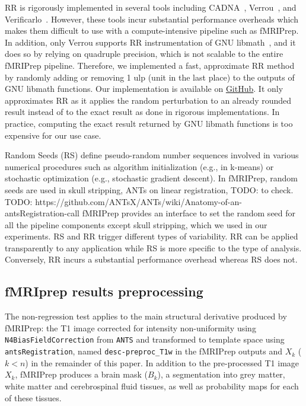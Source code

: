 \documentclass{article}
\newcommand{\TODO}[1]{\color{red}\textsc{TODO:} #1\color{black}\xspace}
\newcommand{\fmriprep}{fMRIPrep\xspace}
\begin{document}
RR is rigorously implemented in several tools including CADNA~\cite{jezequel2008cadna}, Verrou~\cite{fevotte2016verrou}, and Verificarlo~\cite{denis2016verificarlo}. However, these tools incur substantial performance overheads which makes them difficult to use with a compute-intensive pipeline such as fMRIPrep. In addition, only Verrou supports RR instrumentation of GNU libmath~\cite{fevotte2019debugging}, and it does so by relying on quadruple precision, which is not scalable to the entire fMRIPrep pipeline. Therefore, we implemented a fast, approximate RR method by randomly adding or removing 1 ulp (unit in the last place) to the outputs of GNU libmath functions. Our implementation is available on \href{https://github.com/verificarlo/fuzzy}{GitHub}. It only approximates RR as it applies the random perturbation to an already rounded result instead of to the exact result as done in rigorous implementations. In practice, computing the exact result returned by GNU libmath functions is too expensive for our use case.

Random Seeds (RS) define pseudo-random number sequences involved in various numerical procedures such as algorithm initialization (e.g., in k-means) or stochastic optimization (e.g., stochastic gradient descent). In fMRIPrep, random seeds are used in skull stripping, ANTs on linear registration, \TODO{to check}. \TODO{https://github.com/ANTsX/ANTs/wiki/Anatomy-of-an-antsRegistration-call} fMRIPrep provides an interface to set the random seed for all the pipeline components except skull stripping, which we used in our experiments. RS and RR trigger different types of variability. RR can be applied transparently to any application while RS is more specific to the type of analysis. Conversely, RR incurs a substantial performance overhead whereas RS does not.

\subsection{fMRIprep results preprocessing}

The non-regression test applies to the main structural derivative produced by \fmriprep: the T1 image corrected for intensity non-uniformity using \texttt{N4BiasFieldCorrection} from \texttt{ANTS} and transformed to template space using \texttt{antsRegistration}, named \texttt{desc-preproc\_T1w} in the \fmriprep outputs and $X_k$ ($k < n$) in the remainder of this paper. In addition to the pre-processed T1 image $X_k$, \fmriprep produces a brain mask ($B_k$), a segmentation into grey matter, white matter and cerebrospinal fluid tissues, as well as probability maps for each of these tissues.
\end{document}

